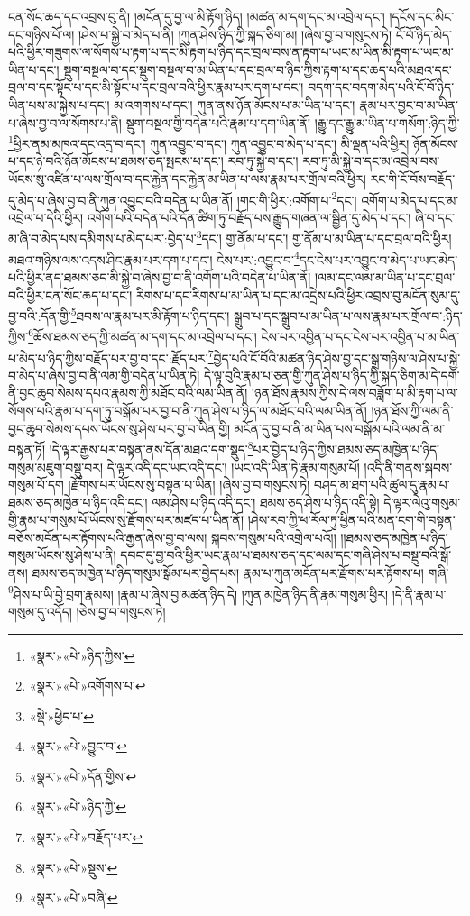 ངན་སོང་ཆད་དང་འབྲས་བུ་ནི། །མངོན་དུ་བྱ་ལ་མི་རྟོག་ཉིད། །མཚན་མ་དག་དང་མ་འབྲེལ་དང་། །དངོས་དང་མིང་དང་གཉིས་པོ་ལ། །ཤེས་པ་སྐྱེ་བ་མེད་པ་ནི། །ཀུན་ཤེས་ཉིད་ཀྱི་སྐད་ཅིག་མ། །ཞེས་བྱ་བ་གསུངས་ཏེ། ངོ་བོ་ཉིད་མེད་པའི་ཕྱིར་གཟུགས་ལ་སོགས་པ་རྟག་པ་དང་མི་རྟག་པ་ཉིད་དང་བྲལ་བས་ན་རྟག་པ་ཡང་མ་ཡིན་མི་རྟག་པ་ཡང་མ་ཡིན་པ་དང་། སྡུག་བསྔལ་བ་དང་སྡུག་བསྔལ་བ་མ་ཡིན་པ་དང་བྲལ་བ་ཉིད་ཀྱིས་རྟག་པ་དང་ཆད་པའི་མཐའ་དང་བྲལ་བ་དང་སྟོང་པ་དང་མི་སྟོང་པ་དང་བྲལ་བའི་ཕྱིར་རྣམ་པར་དག་པ་དང་། བདག་དང་བདག་མེད་པའི་ངོ་བོ་ཉིད་ཡིན་པས་མ་སྐྱེས་པ་དང་། མ་འགགས་པ་དང་། ཀུན་ནས་ཉོན་མོངས་པ་མ་ཡིན་པ་དང་། རྣམ་པར་བྱང་བ་མ་ཡིན་པ་ཞེས་བྱ་བ་ལ་སོགས་པ་ནི། སྡུག་བསྔལ་གྱི་བདེན་པའི་རྣམ་པ་དག་ཡིན་ནོ། །རྒྱུ་དང་རྒྱུ་མ་ཡིན་པ་གསོག་:ཉིད་ཀྱི་\footnote{«སྣར་»«པེ་»ཉིད་ཀྱིས་}ཕྱིར་ནམ་མཁའ་དང་འདྲ་བ་དང་། ཀུན་འབྱུང་བ་དང་། ཀུན་འབྱུང་བ་མེད་པ་དང་། མི་ལྡན་པའི་ཕྱིར། ཉོན་མོངས་པ་དང་ཉེ་བའི་ཉོན་མོངས་པ་ཐམས་ཅད་སྤངས་པ་དང་། རབ་ཏུ་སྐྱེ་བ་དང་། རབ་ཏུ་མི་སྐྱེ་བ་དང་མ་འབྲེལ་བས་ཡོངས་སུ་འཛིན་པ་ལས་གྲོལ་བ་དང་རྐྱེན་དང་རྐྱེན་མ་ཡིན་པ་ལས་རྣམ་པར་གྲོལ་བའི་ཕྱིར། རང་གི་ངོ་བོས་བརྗོད་དུ་མེད་པ་ཞེས་བྱ་བ་ནི་ཀུན་འབྱུང་བའི་བདེན་པ་ཡིན་ནོ། །གང་གི་ཕྱིར་:འགོག་པ་\footnote{«སྣར་»«པེ་»འགོགས་པ་}དང་། འགོག་པ་མེད་པ་དང་མ་འབྲེལ་པ་དེའི་ཕྱིར། འགོག་པའི་བདེན་པའི་དོན་ཚིག་ཏུ་བརྗོད་པས་རྒྱུད་གཞན་ལ་སྦྱིན་དུ་མེད་པ་དང་། ཞི་བ་དང་མ་ཞི་བ་མེད་པས་དམིགས་པ་མེད་པར་:བྱེད་པ་\footnote{«སྡེ་»ཕྱེད་པ་}དང་། གྱ་ནོམ་པ་དང་། གྱ་ནོམ་པ་མ་ཡིན་པ་དང་བྲལ་བའི་ཕྱིར། མཐའ་གཉིས་ལས་འདས་ཤིང་རྣམ་པར་དག་པ་དང་། ངེས་པར་:འབྱུང་བ་\footnote{«སྣར་»«པེ་»བྱུང་བ་}དང་ངེས་པར་འབྱུང་བ་མེད་པ་ཡང་མེད་པའི་ཕྱིར་ནད་ཐམས་ཅད་མི་སྐྱེ་བ་ཞེས་བྱ་བ་ནི་འགོག་པའི་བདེན་པ་ཡིན་ནོ། །ལམ་དང་ལམ་མ་ཡིན་པ་དང་བྲལ་བའི་ཕྱིར་ངན་སོང་ཆད་པ་དང་། རིགས་པ་དང་རིགས་པ་མ་ཡིན་པ་དང་མ་འདྲེས་པའི་ཕྱིར་འབྲས་བུ་མངོན་སུམ་དུ་བྱ་བའི་:དོན་གྱི་\footnote{«སྣར་»«པེ་»དོན་གྱིས་}ཐབས་ལ་རྣམ་པར་མི་རྟོག་པ་ཉིད་དང་། སྒྲུབ་པ་དང་སྒྲུབ་པ་མ་ཡིན་པ་ལས་རྣམ་པར་གྲོལ་བ་:ཉིད་ཀྱིས་\footnote{«སྣར་»«པེ་»ཉིད་ཀྱི་}ཆོས་ཐམས་ཅད་ཀྱི་མཚན་མ་དག་དང་མ་འབྲེལ་པ་དང་། ངེས་པར་འབྱིན་པ་དང་ངེས་པར་འབྱིན་པ་མ་ཡིན་པ་མེད་པ་ཉིད་ཀྱིས་བརྗོད་པར་བྱ་བ་དང་:རྗོད་པར་\footnote{«སྣར་»«པེ་»བརྗོད་པར་}བྱེད་པའི་ངོ་བོའི་མཚན་ཉིད་ཤེས་བྱ་དང་སྒྲ་གཉིས་ལ་ཤེས་པ་སྐྱེ་བ་མེད་པ་ཞེས་བྱ་བ་ནི་ལམ་གྱི་བདེན་པ་ཡིན་ཏེ། དེ་ལྟ་བུའི་རྣམ་པ་ཅན་གྱི་ཀུན་ཤེས་པ་ཉིད་ཀྱི་སྐད་ཅིག་མ་དེ་དག་ནི་བྱང་ཆུབ་སེམས་དཔའ་རྣམས་ཀྱི་མཐོང་བའི་ལམ་ཡིན་ནོ། །ཉན་ཐོས་རྣམས་ཀྱིས་དེ་ལས་བཟློག་པ་མི་རྟག་པ་ལ་སོགས་པའི་རྣམ་པ་དག་ཏུ་བསྒོམ་པར་བྱ་བ་ནི་ཀུན་ཤེས་པ་ཉིད་ལ་མཐོང་བའི་ལམ་ཡིན་ནོ། །ཉན་ཐོས་ཀྱི་ལམ་ནི་བྱང་ཆུབ་སེམས་དཔས་ཡོངས་སུ་ཤེས་པར་བྱ་བ་ཡིན་གྱི། མངོན་དུ་བྱ་བ་ནི་མ་ཡིན་པས་བསྒོམ་པའི་ལམ་ནི་མ་བསྟན་ཏོ། །དེ་ལྟར་རྒྱས་པར་བསྟན་ནས་དོན་མཐའ་དག་སྡུད་\footnote{«སྣར་»«པེ་»སྡུས་}པར་བྱེད་པ་ཉིད་ཀྱིས་ཐམས་ཅད་མཁྱེན་པ་ཉིད་གསུམ་མཇུག་བསྡུ་བར། དེ་ལྟར་འདི་དང་ཡང་འདི་དང་། །ཡང་འདི་ཡིན་ཏེ་རྣམ་གསུམ་པོ། །འདི་ནི་གནས་སྐབས་གསུམ་པོ་དག །རྫོགས་པར་ཡོངས་སུ་བསྟན་པ་ཡིན། །ཞེས་བྱ་བ་གསུངས་ཏེ། བཤད་མ་ཐག་པའི་ཚུལ་དུ་རྣམ་པ་ཐམས་ཅད་མཁྱེན་པ་ཉིད་འདི་དང་། ལམ་ཤེས་པ་ཉིད་འདི་དང་། ཐམས་ཅད་ཤེས་པ་ཉིད་འདི་སྟེ། དེ་ལྟར་ལེའུ་གསུམ་གྱི་རྣམ་པ་གསུམ་པོ་ཡོངས་སུ་རྫོགས་པར་མཛད་པ་ཡིན་ནོ། །ཤེས་རབ་ཀྱི་ཕ་རོལ་ཏུ་ཕྱིན་པའི་མན་ངག་གི་བསྟན་བཅོས་མངོན་པར་རྟོགས་པའི་རྒྱན་ཞེས་བྱ་བ་ལས། སྐབས་གསུམ་པའི་འགྲེལ་པའོ།། །།ཐམས་ཅད་མཁྱེན་པ་ཉིད་གསུམ་ཡོངས་སུ་ཤེས་པ་ནི། དབང་དུ་བྱ་བའི་ཕྱིར་ཡང་རྣམ་པ་ཐམས་ཅད་དང་ལམ་དང་གཞི་ཤེས་པ་བསྡུ་བའི་སྒོ་ནས། ཐམས་ཅད་མཁྱེན་པ་ཉིད་གསུམ་སྒོམ་པར་བྱེད་པས། རྣམ་པ་ཀུན་མངོན་པར་རྫོགས་པར་རྟོགས་པ། གཞི་\footnote{«སྣར་»«པེ་»བཞི་}ཤེས་པ་ཡི་བྱེ་བྲག་རྣམས། །རྣམ་པ་ཞེས་བྱ་མཚན་ཉིད་དེ། །ཀུན་མཁྱེན་ཉིད་ནི་རྣམ་གསུམ་ཕྱིར། །དེ་ནི་རྣམ་པ་གསུམ་དུ་འདོད། །ཅེས་བྱ་བ་གསུངས་ཏེ། 